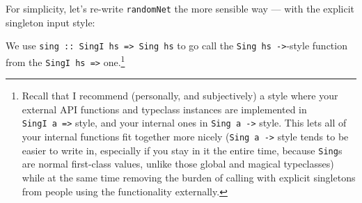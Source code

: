 \documentclass[]{article}
\newenvironment{Shaded}{}{}
\newcommand{\CommentTok}[1]{\textcolor[rgb]{0.38,0.63,0.69}{\textit{#1}}}
\newcommand{\DataTypeTok}[1]{\textcolor[rgb]{0.56,0.13,0.00}{#1}}
\newcommand{\KeywordTok}[1]{\textcolor[rgb]{0.00,0.44,0.13}{\textbf{#1}}}
\newcommand{\NormalTok}[1]{#1}
\newcommand{\OperatorTok}[1]{\textcolor[rgb]{0.40,0.40,0.40}{#1}}
\newcommand{\OtherTok}[1]{\textcolor[rgb]{0.00,0.44,0.13}{#1}}
\begin{document}
For simplicity, let's re-write \texttt{randomNet} the more sensible way --- with
the explicit singleton input style:

\begin{Shaded}
\end{Shaded}

We use \texttt{sing\ ::\ SingI\ hs\ =\textgreater{}\ Sing\ hs} to go call the
\texttt{Sing\ hs\ -\textgreater{}}-style function from the
\texttt{SingI\ hs\ =\textgreater{}} one.\footnote{Recall that I recommend
  (personally, and subjectively) a style where your external API functions and
  typeclass instances are implemented in \texttt{SingI\ a\ =\textgreater{}}
  style, and your internal ones in \texttt{Sing\ a\ -\textgreater{}} style. This
  lets all of your internal functions fit together more nicely
  (\texttt{Sing\ a\ -\textgreater{}} style tends to be easier to write in,
  especially if you stay in it the entire time, because \texttt{Sing}s are
  normal first-class values, unlike those global and magical typeclasses) while
  at the same time removing the burden of calling with explicit singletons from
  people using the functionality externally.}
\end{document}
